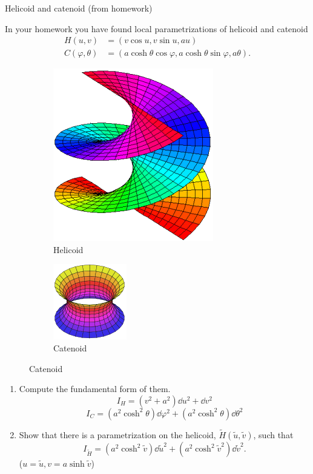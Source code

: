 \begin{example} Helicoid and catenoid (from homework)

In your homework you have found local parametrizations of helicoid and 
catenoid 
\begin{align*}
    H(u,v)&=\left(v\cos u, v\sin u, a u\right)\\
    C(\varphi,\theta)&=\left(a \cosh \theta \cos \varphi,
    a\cosh \theta \sin \varphi ,a \theta \right) .       
\end{align*}
\begin{figure}[h]
    \centering
    \begin{subfigure}{0.3\textwidth}
        \centering
        \includegraphics[scale=0.65]{picture/week7/helicoid.png}
        \caption{Helicoid}
    \end{subfigure}
    \begin{subfigure}{0.3\textwidth}
        \centering
        \includegraphics[scale=1.49]{picture/week7/catenoid.png}
        \caption{Catenoid}    
    \end{subfigure}
\end{figure}
\begin{enumerate}[(1)]
    \item Compute the  fundamental form of them.
    \[ I_H=\left(v^2+a^2\right)\dd u^2+\dd v^2\]
    \[I_C=\left(a^2\cosh^2\theta\right)\dd\varphi^2+
    \left(a^2\cosh^2\theta\right)\dd \theta^2\]
    \item Show that there is a parametrization on the helicoid, 
    \(\tilde{H}\left(\tilde{u},\tilde{v}\right)\), such that
    \[
        I_{\tilde{H}}=\left(a^2\cosh^2\tilde{v}\right)\dd \tilde{u}^2
        +\left(a^2\cosh^2\tilde{v}^2\right)\dd \tilde{v}^2    
    .\]
    (\(u=\tilde{u},v=a\sinh\tilde{v}\))
\end{enumerate}
\end{example}
